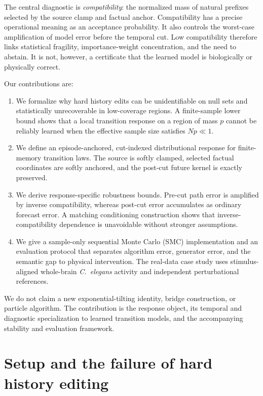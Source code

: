\documentclass{article}
\theoremstyle{remark}
\begin{document}
The central diagnostic is \emph{compatibility}: the normalized mass of natural
prefixes selected by the source clamp and factual anchor. Compatibility has a
precise operational meaning as an acceptance probability. It also controls the
worst-case amplification of model error before the temporal cut. Low
compatibility therefore links statistical fragility, importance-weight
concentration, and the need to abstain. It is not, however, a certificate that
the learned model is biologically or physically correct.

Our contributions are:
\begin{enumerate}[leftmargin=1.5em]
  \item We formalize why hard history edits can be unidentifiable on null sets
  and statistically unrecoverable in low-coverage regions. A finite-sample
  lower bound shows that a local transition response on a region of mass \(p\)
  cannot be reliably learned when the effective sample size satisfies
  \(Np\ll 1\).
  \item We define an episode-anchored, cut-indexed distributional response for
  finite-memory transition laws. The source is softly clamped, selected
  factual coordinates are softly anchored, and the post-cut future kernel is
  exactly preserved.
  \item We derive response-specific robustness bounds. Pre-cut path error is
  amplified by inverse compatibility, whereas post-cut error accumulates as
  ordinary forecast error. A matching conditioning construction shows that
  inverse-compatibility dependence is unavoidable without stronger
  assumptions.
  \item We give a sample-only sequential Monte Carlo (SMC) implementation and
  an evaluation protocol that separates algorithm error, generator error, and
  the semantic gap to physical intervention. The real-data case study uses
  stimulus-aligned whole-brain \emph{C.\ elegans} activity and independent
  perturbational references.
\end{enumerate}

We do not claim a new exponential-tilting identity, bridge construction, or
particle algorithm. The contribution is the response object, its temporal and
diagnostic specialization to learned transition models, and the accompanying
stability and evaluation framework.

\section{Setup and the failure of hard history editing}
\label{sec:setup}
\end{document}
